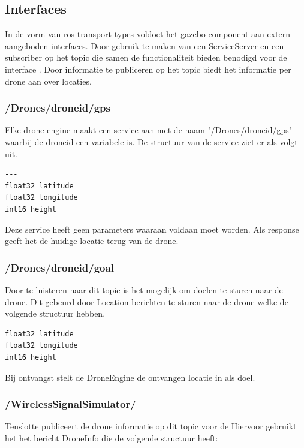 \documentclass[a4paper, 11pt, oneside]{report}
\begin{document}
\subsection{Interfaces}
\label{DetailedDesign:MeshNetwerk:interfaces}
In de vorm van ros transport types voldoet het gazebo component aan extern aangeboden interfaces.
Door gebruik te maken van een ServiceServer  en een subscriber op het topic  die samen de functionaliteit bieden benodigd voor de interface . 
Door informatie te publiceren op het topic  biedt het informatie per drone aan over locaties.

\subsubsection{/Drones/drone\textunderscore id/gps}
\label{DetailedDesign:MeshNetwerk:interfaces:requestgps}

Elke drone engine maakt een service aan met de naam "\slash Drones/drone\textunderscore id/gps"	waarbij de drone\textunderscore id een variabele is.
De structuur van de service ziet er als volgt uit.
\begin{lstlisting}
---
float32 latitude
float32 longitude
int16 height
\end{lstlisting}

Deze service heeft geen parameters waaraan voldaan moet worden. 
Als response geeft het de huidige locatie terug van de drone.

\subsubsection{/Drones/drone\textunderscore id/goal}
\label{DetailedDesign:MeshNetwerk:interfaces:location}

Door te luisteren naar dit topic is het mogelijk om doelen te sturen naar de drone. 
Dit gebeurd door Location berichten te sturen naar de drone welke de volgende structuur hebben.

\begin{lstlisting}
float32 latitude
float32 longitude
int16 height
\end{lstlisting}

Bij ontvangst stelt de DroneEngine de ontvangen locatie in als doel.

\subsubsection{\slash WirelessSignalSimulator\slash}
\label{DetailedDesign:MeshNetwerk:interfaces:droneinfo}
Tenslotte publiceert de drone informatie op dit topic voor de 
Hiervoor gebruikt het het bericht DroneInfo die de volgende structuur heeft:
\end{document}
